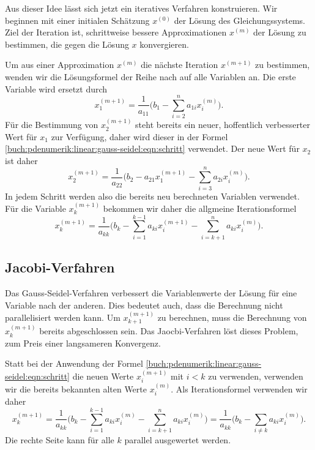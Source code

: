 Aus dieser Idee lässt sich jetzt ein iteratives Verfahren konstruieren.
Wir beginnen mit einer initialen Schätzung $x^{(0)}$ der Lösung des
Gleichungssystems.
Ziel der Iteration ist, schrittweise bessere Approximationen $x^{(m)}$
der Lösung zu bestimmen, die gegen die Lösung $x$ konvergieren.

Um aus einer Approximation $x^{(m)}$ die nächste Iteration $x^{(m+1)}$
zu bestimmen, wenden wir die Lösungsformel der Reihe nach auf alle
Variablen an.
Die erste Variable wird ersetzt durch
\[
x_1^{(m+1)}
=
\frac{1}{a_{11}}
\biggl(
b_1
-
\sum_{i=2}^n a_{1i}x_i^{(m)}
\biggr).
\]
Für die Bestimmung von $x_2^{(m+1)}$ steht bereits ein neuer,
hoffentlich verbesserter Wert für $x_1$ zur Verfügung, daher wird
dieser in der Formel \eqref{buch:pdenumerik:linear:gauss-seidel:eqn:schritt}
verwendet.
Der neue Wert für $x_2$ ist daher
\begin{equation}
x_2^{(m+1)}
=
\frac{1}{a_{22}}
\biggl(
b_2 - a_{21}x_1^{(m+1)}
-
\sum_{i=3}^n a_{2i}x_i^{(m)}
\biggr).
\end{equation}
In jedem Schritt werden also die bereits neu berechneten Variablen
verwendet.
Für die Variable $x_k^{(m+1)}$ bekommen wir daher die allgmeine
Iterationsformel
\begin{equation}
x_k^{(m+1)}
=
\frac{1}{a_{kk}}
\biggl(
b_k - \sum_{i=1}^{k-1} a_{ki}x_i^{(m+1)} - \sum_{i=k+1}^n a_{ki}x_i^{(m)}
\biggr).
\label{buch:pdenumerik:linear:gauss-seidel:iteration}
\end{equation}

%
%
\subsection{Jacobi-Verfahren
\label{buch:pdenumerik:linear:subsection:jacobi}}
Das Gauss-Seidel-Verfahren verbessert die Variablenwerte der Lösung
für eine Variable nach der anderen.
Dies bedeutet auch, dass die Berechnung nicht parallelisiert werden
kann.
Um $x_{k+1}^{(m+1)}$ zu berechnen, muss die Berechnung von $x_k^{(m+1)}$
bereits abgeschlossen sein.
Das Jaocbi-Verfahren löst dieses Problem, zum Preis einer langsameren
Konvergenz.

Statt bei der Anwendung der Formel
\eqref{buch:pdenumerik:linear:gauss-seidel:eqn:schritt}
die neuen Werte $x_i^{(m+1)}$ mit $i<k$ zu verwenden, verwenden wir
die bereits bekannten alten Werte $x_i^{(m)}$.
Als Iterationsformel verwenden wir daher
\begin{equation}
x_k^{(m+1)}
=
\frac{1}{a_{kk}}
\biggl(
b_k
-
\sum_{i=1}^{k-1} a_{ki} x_i^{(m)}
-
\sum_{i=k+1}^n a_{ki} x_i^{(m)}
\biggr)
=
\frac{1}{a_{kk}}
\biggl(
b_k
-
\sum_{i\ne k} a_{ki} x_i^{(m)}
\biggr).
\label{buch:pdelinear:jacobi:eqn:iteration}
\end{equation}
Die rechte Seite kann für alle $k$ parallel ausgewertet werden.

